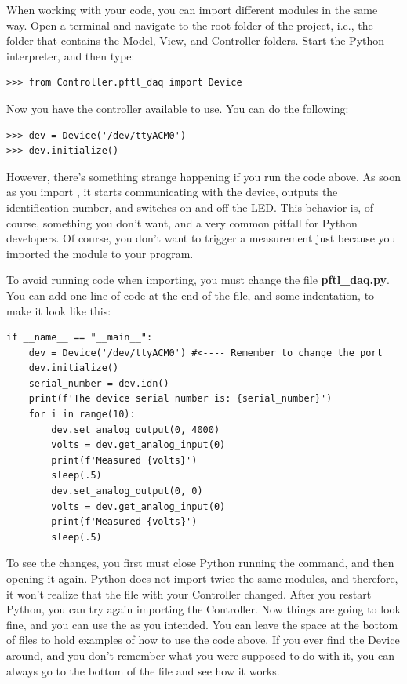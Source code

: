 When working with your code, you can import different modules in the same way. Open a terminal and navigate to the root folder of the project, i.e., the folder that contains the Model, View, and Controller folders. Start the Python interpreter, and then type:

\begin{verbatim}
>>> from Controller.pftl_daq import Device
\end{verbatim}

Now you have the controller available to use. You can do the following:

\begin{verbatim}
>>> dev = Device('/dev/ttyACM0')
>>> dev.initialize()
\end{verbatim}

However, there's something strange happening if you run the code above. As soon as you import , it starts communicating with the device, outputs the identification number, and switches on and off the LED. This behavior is, of course, something you don't want, and a very common pitfall for Python developers. Of course, you don't want to trigger a measurement just because you imported the module to your program.

To avoid running code when importing, you must change the file \textbf{pftl\_daq.py}. You can add one line of code at the end of the file, and some indentation, to make it look like this:

\begin{verbatim}
if __name__ == "__main__":
    dev = Device('/dev/ttyACM0') #<---- Remember to change the port
    dev.initialize()
    serial_number = dev.idn()
    print(f'The device serial number is: {serial_number}')
    for i in range(10):
        dev.set_analog_output(0, 4000)
        volts = dev.get_analog_input(0)
        print(f'Measured {volts}')
        sleep(.5)
        dev.set_analog_output(0, 0)
        volts = dev.get_analog_input(0)
        print(f'Measured {volts}')
        sleep(.5)
\end{verbatim}

To see the changes, you first must close Python running the  command, and then opening it again. Python does not import twice the same modules, and therefore, it won't realize that the file with your Controller changed. After you restart Python, you can try again importing the Controller. Now things are going to look fine, and you can use the  as you intended. You can leave the space at the bottom of files to hold examples of how to use the code above. If you ever find the Device around, and you don't remember what you were supposed to do with it, you can always go to the bottom of the file and see how it works.

